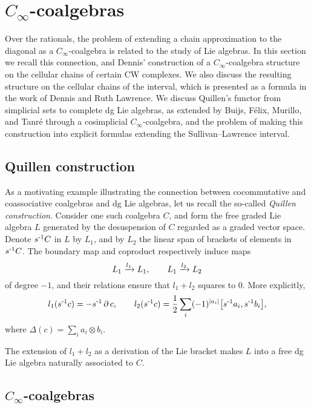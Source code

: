 
\section{\texorpdfstring{$C_\infty$}{C-infty}-coalgebras} \label{s:rationally}

Over the rationals, the problem of extending a chain approximation to the diagonal as a $C_\infty$-coalgebra is related to the study of Lie algebras.
In this section we recall this connection, and Dennis' construction of a $C_\infty$-coalgebra structure on the cellular chains of certain CW complexes.
We also discuss the resulting structure on the cellular chains of the interval, which is presented as a formula in the work of Dennis and Ruth Lawrence.
We discuss Quillen's functor from simplicial sets to complete dg Lie algebras, as extended by Buijs, F{\'e}lix, Murillo, and Tanr{\'e} through a cosimplicial $C_\infty$-coalgebra, and the problem of making this construction into explicit formulas extending the Sullivan--Lawrence interval.

\subsection{Quillen construction}

As a motivating example illustrating the connection between cocommutative and coassociative coalgebras and dg Lie algebras, let us recall the so-called \textit{Quillen construction}.
Consider one such coalgebra $C$, and form the free graded Lie algebra $L$ generated by the desuspension of $C$ regarded as a graded vector space.
Denote $s^{\mbox{\scriptsize -1}}C$ in $L$ by $L_1$, and by $L_2$ the linear span of brackets of elements in $s^{\mbox{\scriptsize -1}}C$.
The boundary map and coproduct respectively induce maps
\[
L_1 \xrightarrow{l_1} L_1,
\qquad
L_1 \xrightarrow{l_2} L_2
\]
of degree $-1$, and their relations ensure that $l_1 + l_2$ squares to $0$.
More explicitly,
\[
l_1(s^{\mbox{\scriptsize -1}}c) = -s^{\mbox{\scriptsize -1}} \operatorname{\partial} c,
\qquad
l_2(s^{\mbox{\scriptsize -1}}c) = \frac{1}{2} \sum_i (-1)^{\lvert a_i\rvert} \big[ s^{\mbox{\scriptsize -1}}a_i, s^{\mbox{\scriptsize -1}}b_i \big],
\]
where $\Delta(c) = \sum_i a_i \otimes b_i$.

The extension of $l_1 + l_2$ as a derivation of the Lie bracket makes $L$ into a free dg Lie algebra naturally associated to $C$.

\subsection{\texorpdfstring{$C_\infty$}{C-infinity}-coalgebras} \label{ss:c-infty definition}

